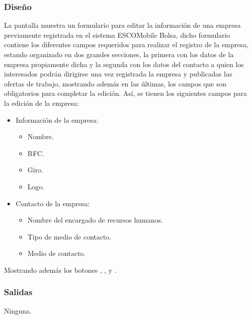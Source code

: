 \subsubsection{Diseño}
	\noindent
	La pantalla muestra un formulario para editar la información de una empresa previamente registrada en el sistema ESCOMobile Bolsa, dicho formulario contiene los diferentes campos requeridos para realizar el registro de la empresa, estando organizado en dos grandes secciones, la primera con los datos de la empresa propiamente dicha y la segunda con los datos del contacto a quien los interesados podrán dirigirse una vez registrada la empresa y publicadas las ofertas de trabajo, mostrando además en las últimas, los campos que son obligatorios para completar la edición. Así, se tienen los siguientes campos para la edición de la empresa:
	\begin{itemize}
		\item Información de la empresa:
		\begin{itemize}
			\item Nombre.
			\item RFC.
			\item Giro.
			\item Logo.
		\end{itemize}
		\item Contacto de la empresa:
		\begin{itemize}
			\item Nombre del encargado de recursos humanos.
			\item Tipo de medio de contacto. 
			\item Medio de contacto. 
		\end{itemize}
	\end{itemize}
	Mostrando además los botones , \IUbutton{+},  y .


\subsubsection{Salidas}
	\noindent
	Ninguna.

